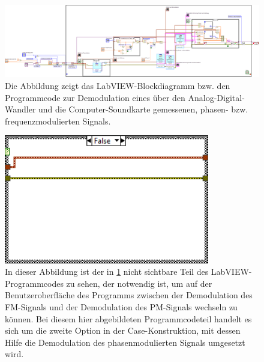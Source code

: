 \documentclass[
a4paper,
12pt,
pagesize,
ngerman
]{scrartcl}
\begin{document}
	
	\begin{figure}[H]
		\centering
		\includegraphics[width=1.0\textwidth]{EIRE2018Dateien/Tag4/OsziFMPM-Demod/FM/OsziPlusFMPMd}
		\caption{Die Abbildung zeigt das LabVIEW-Blockdiagramm bzw. den Programmcode zur Demodulation eines über den Analog-Digital-Wandler und die Computer-Soundkarte gemessenen, phasen- bzw. frequenzmodulierten Signals.}
		\label{FMPMDemodProgrammcode1}
	\end{figure}
	
	\begin{figure}[H]
		\centering
		\includegraphics[width=0.8\textwidth]{EIRE2018Dateien/Tag4/OsziFMPM-Demod/PM/OsziPlusFMPMd5} %
		\caption{In dieser Abbildung ist der in \cref{FMPMDemodProgrammcode1} nicht sichtbare Teil des LabVIEW-Programmcodes zu sehen, der notwendig ist, um auf der Benutzeroberfläche des Programms zwischen der Demodulation des FM-Signals und der Demodulation des PM-Signals wechseln zu können. Bei diesem hier abgebildeten Programmcodeteil handelt es sich um die zweite Option in der Case-Konstruktion, mit dessen Hilfe die Demodulation des phasenmodulierten Signals umgesetzt wird.}
		\label{FMPMDemodProgrammcode2}
	\end{figure}
	
\end{document}
